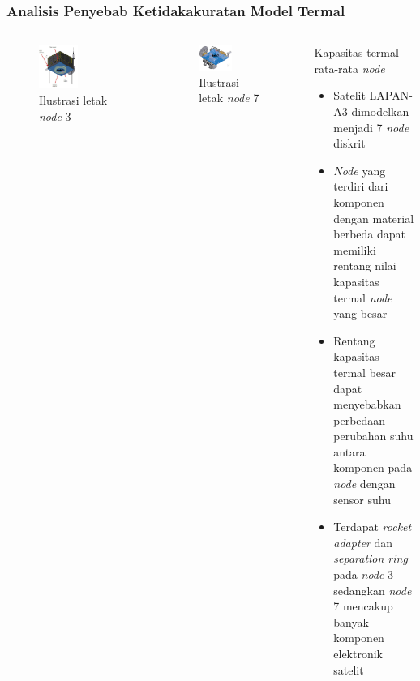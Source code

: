 \documentclass[8pt]{beamer}
\begin{document}
\begin{frame}
  \frametitle{Analisis Penyebab Ketidakakuratan Model Termal}
  \begin{columns}[T]
      \begin{figure}
          \includegraphics[width=0.5\textwidth]{figure/node3.png}
            \caption{Ilustrasi letak \textit{node} 3}
      \end{figure}
      \begin{figure}
          \includegraphics[width=0.5\textwidth]{figure/node7.png}
            \caption{Ilustrasi letak \textit{node} 7}
      \end{figure}
    \begin{block}{\center \normalsize Kapasitas termal rata-rata \textit{node}}
      \begin{itemize}
      \item Satelit LAPAN-A3 dimodelkan menjadi 7 \textit{node} diskrit
      \item \textit{Node} yang terdiri dari komponen dengan material berbeda dapat memiliki rentang nilai kapasitas termal \textit{node} yang besar
      \item Rentang kapasitas termal besar dapat menyebabkan perbedaan perubahan suhu antara komponen pada \textit{node} dengan sensor suhu
      \item Terdapat \textit{rocket adapter} dan \textit{separation ring} pada \textit{node} 3 sedangkan \textit{node} 7 mencakup banyak komponen elektronik satelit
      \end{itemize}
    \end{block}
  \end{columns}
\end{frame}
\end{document}
